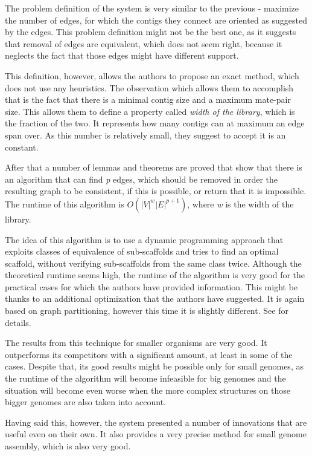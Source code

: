 \documentclass[11pt]{article}
\begin{document}
The problem definition of the system is very similar to the previous - maximize
the number of edges, for which the contigs they connect are oriented as
suggested by the edges. This problem definition might not be the best one, as it
suggests that removal of edges are equivalent, which does not seem right,
because it neglects the fact that those edges might have different support.

This definition, however, allows the authors to propose an exact method, which
does not use any heuristics. The observation which allows them to accomplish
that is the fact that there is a minimal contig size and a maximum mate-pair size.
This allows them to define a property called \emph{width of the library}, which
is the fraction of the two. It represents how many contigs can at maximum an
edge span over. As this number is relatively small, they suggest to accept it is
an constant. 

After that a number of lemmas and theorems are proved that show that there is an
algorithm that can find \emph{p} edges, which should be removed in order the
resulting graph to be consistent, if this is possible, or return that it is
impossible. The runtime of this algorithm is $O(|V|^w |E|^{p + 1})$, where
\emph{w} is the width of the library.

The idea of this algorithm is to use a dynamic programming approach that
exploits classes of equivalence of sub-scaffolds and tries to find an optimal
scaffold, without verifying sub-scaffolds from the same class twice. Although
the theoretical runtime seems high, the runtime of the algorithm is very good
for the practical cases for which the authors have provided information. This
might be thanks to an additional optimization that the authors have suggested.
It is again based on graph partitioning, however this time it is slightly
different. See \cite{Opera} for details.

The results from this technique for smaller organisms are very good. It
outperforms its competitors with a significant amount, at least in some of the
cases. Despite that, its good results might be possible only for small genomes,
as the runtime of the algorithm will become infeasible for big genomes and the
situation will become even worse when the more complex structures on those
bigger genomes are also taken into account. 

Having said this, however, the system presented a number of innovations that are
useful even on their own. It also provides a very precise method for small
genome assembly, which is also very good.
\end{document}
